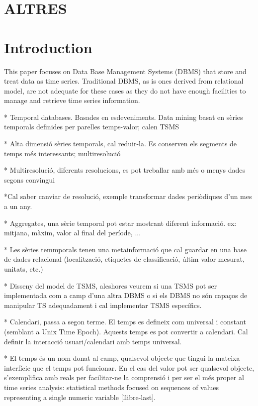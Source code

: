 \documentclass{acm_proc_article-sp}
\begin{document}





\section{ALTRES}



\section{Introduction}

This paper focuses on Data Base Management Systems (DBMS) that store
and treat data as time series. Traditional DBMS, as is ones derived
from relational model, are not adequate for these cases as they do not
have enough facilities to manage and retrieve time series
information.



* Temporal databases. Basades en esdeveniments. Data mining basat en sèries temporals definides per parelles temps-valor; calen TSMS

* Alta dimensió sèries temporals, cal reduir-la. Es conserven els segments de temps més interessants; multiresolució

* Multiresolució, diferents resolucions, es pot treballar amb més o menys dades segons convingui

*Cal saber canviar de resolució, exemple transformar dades periòdiques d'un mes a un any.

* Aggregates, una sèrie temporal pot estar mostrant diferent informació. ex: mitjana, màxim, valor al final del període, ...

* Les sèries temmporals tenen una metainformació que cal guardar en una base de dades relacional (localització, etiquetes de classificació, últim valor mesurat, unitats, etc.)

* Disseny del model de TSMS, aleshores veurem si una TSMS pot ser implementada com a camp d'una altra DBMS o si els DBMS no són capaços de manipular TS adequadament i cal implementar TSMS específics.

* Calendari, passa a segon terme. El temps es defineix com universal i constant (semblant a Unix Time Epoch). Aquests temps es pot convertir a calendari. Cal definir la interacció usuari/calendari amb temps universal.

* El temps és un nom donat al camp, qualsevol objecte que tingui la mateixa interfície que el temps pot funcionar. En el cas del valor pot ser qualsevol objecte, s'exemplifica amb reals per facilitar-ne la comprensió i per ser el més proper al time series analysis: statistical methods focused on sequences of values representing a single numeric variable [llibre-last].
\end{document}
